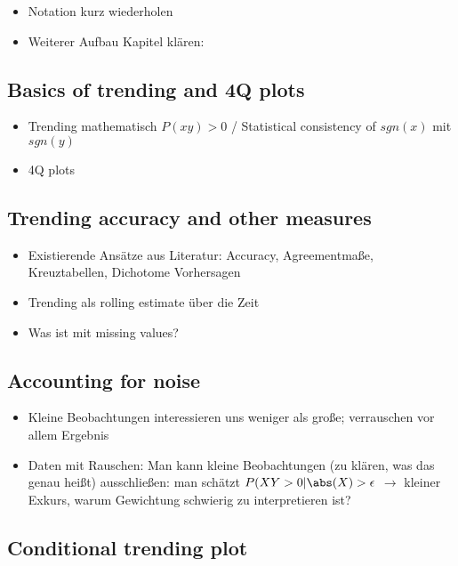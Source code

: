 
\begin{itemize}
    \item Notation kurz wiederholen
    \item Weiterer Aufbau Kapitel klären: 
\end{itemize}

\subsection{Basics of trending and 4Q plots}

\begin{itemize}
    \item Trending mathematisch $P(x y) > 0$ / Statistical consistency of $sgn(x)$ mit $sgn(y)$
    \item 4Q plots
\end{itemize}

\subsection{Trending accuracy and other measures}

\begin{itemize}
    \item Existierende Ansätze aus Literatur: Accuracy, Agreementmaße, Kreuztabellen, Dichotome Vorhersagen
    \item Trending als rolling estimate über die Zeit
    \item Was ist mit missing values?
\end{itemize}

\subsection{Accounting for noise}

\begin{itemize}
    \item Kleine Beobachtungen interessieren uns weniger als große; verrauschen vor allem Ergebnis
    \item Daten mit Rauschen: Man kann kleine Beobachtungen (zu klären, was das genau heißt) ausschließen: man schätzt $P(XY > 0 | \abs (X) > \epsilon$ $\rightarrow$ kleiner Exkurs, warum Gewichtung schwierig zu interpretieren ist?
    
\end{itemize}

\subsection{Conditional trending plot}

